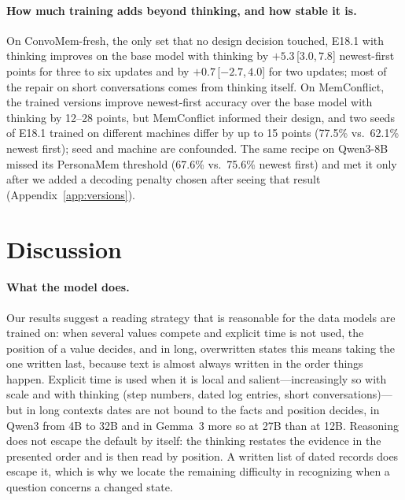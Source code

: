 \documentclass[11pt]{article}
\newcommand{\ci}[2]{\,[$#1$,\,$#2$]}
\begin{document}
\paragraph{How much training adds beyond thinking, and how stable it is.}
On ConvoMem-fresh, the only set that no design decision touched, E18.1 with thinking improves on the base model with thinking by $+5.3$\ci{3.0}{7.8} newest-first points for three to six updates and by $+0.7$\ci{-2.7}{4.0} for two updates; most of the repair on short conversations comes from thinking itself. On MemConflict, the trained versions improve newest-first accuracy over the base model with thinking by 12--28 points, but MemConflict informed their design, and two seeds of E18.1 trained on different machines differ by up to 15 points (77.5\% vs.\ 62.1\% newest first); seed and machine are confounded. The same recipe on Qwen3-8B missed its PersonaMem threshold (67.6\% vs.\ 75.6\% newest first) and met it only after we added a decoding penalty chosen after seeing that result (Appendix~\ref{app:versions}).

\section{Discussion}
\label{sec:discussion}

\paragraph{What the model does.}
Our results suggest a reading strategy that is reasonable for the data models are trained on: when several values compete and explicit time is not used, the position of a value decides, and in long, overwritten states this means taking the one written last, because text is almost always written in the order things happen. Explicit time is used when it is local and salient---increasingly so with scale and with thinking (step numbers, dated log entries, short conversations)---but in long contexts dates are not bound to the facts and position decides, in Qwen3 from 4B to 32B and in Gemma~3 more so at 27B than at 12B. Reasoning does not escape the default by itself: the thinking restates the evidence in the presented order and is then read by position. A written list of dated records does escape it, which is why we locate the remaining difficulty in recognizing when a question concerns a changed state.
\end{document}
